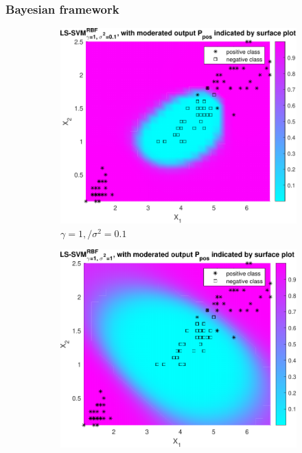 \documentclass{article}
\begin{document}
        \subsubsection{Bayesian framework} 
            \begin{figure}[h]
                 \centering
                 \begin{subfigure}[b]{0.3\textwidth}
                     \centering
                     \includegraphics[width=\textwidth]{Assignment 1/figures/bayes_rbf_gamma_1_sig2_1.000000e-01}
                    \caption{$\gamma = 1,/ \sigma^2 = 0.1$}
                     \label{fig:bayes_1}
                 \end{subfigure}
                 \hfill
                 \begin{subfigure}[b]{0.3\textwidth}
                     \centering
                     \includegraphics[width=\textwidth]{Assignment 1/figures/bayes_rbf_gamma_1_sig2_1.pdf}

\end{subfigure}
\end{figure}
\end{document}
